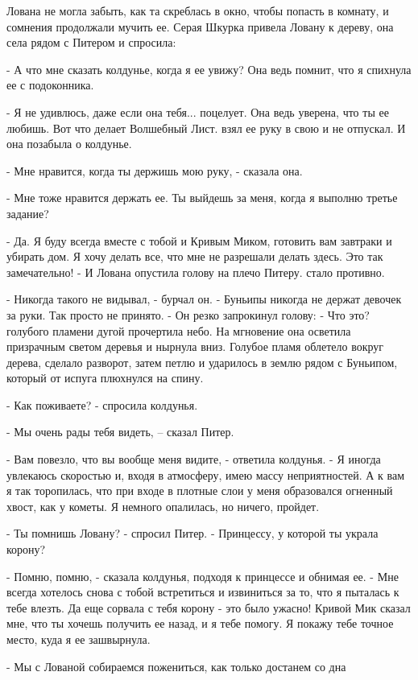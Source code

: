  Лована не могла забыть, как та скреблась в окно, чтобы попасть 
в комнату, и сомнения продолжали мучить ее.
 Серая Шкурка привела Ловану к дереву, она села рядом с 
Питером и спросила:
\par- А что мне сказать колдунье, когда я ее увижу? Она ведь помнит, 
что я спихнула ее с подоконника.
\par- Я не удивлюсь, даже если она тебя... поцелует. Она ведь уверена, 
что ты ее любишь. Вот что делает Волшебный Лист.
 взял ее руку в свою и не отпускал. И она позабыла о колдунье.
\par- Мне нравится, когда ты держишь мою руку, - сказала она.
\par- Мне тоже нравится держать ее. Ты выйдешь за меня, когда я 
выполню третье задание?
\par- Да. Я буду всегда вместе с тобой и Кривым Миком, готовить вам 
завтраки и убирать дом. Я хочу делать все, что мне не разрешали делать 
здесь. Это так замечательно! - И Лована опустила голову на плечо 
Питеру.
 стало противно.
\par- Никогда такого не видывал, - бурчал он. - Буньипы никогда не 
держат девочек за руки. Так просто не принято. - Он резко запрокинул 
голову: - Что это?
 голубого пламени дугой прочертила небо. На мгновение она 
осветила призрачным светом деревья и нырнула вниз. Голубое пламя 
облетело вокруг дерева, сделало разворот, затем петлю и ударилось в 
землю рядом с Буньипом, который от испуга плюхнулся на спину.
\par- Как поживаете? - спросила колдунья.
\par- Мы очень рады тебя видеть, -- сказал Питер.
\par- Вам повезло, что вы вообще меня видите, - ответила колдунья. - Я 
иногда увлекаюсь скоростью и, входя в атмосферу, имею массу 
неприятностей. А к вам я так торопилась, что при входе в плотные слои 
у меня образовался огненный хвост, как у кометы. Я немного опалилась, 
но ничего, пройдет.
\par- Ты помнишь Ловану? - спросил Питер. - Принцессу, у которой ты 
украла корону?
\par- Помню, помню, - сказала колдунья, подходя к принцессе и обнимая 
ее. - Мне всегда хотелось снова с тобой встретиться и извиниться за 
то, что я пыталась к тебе влезть. Да еще сорвала с тебя корону - это 
было ужасно! Кривой Мик сказал мне, что ты хочешь получить ее назад, и 
я тебе помогу. Я покажу тебе точное место, куда я ее зашвырнула.
\par- Мы с Лованой собираемся пожениться, как только достанем со дна 
